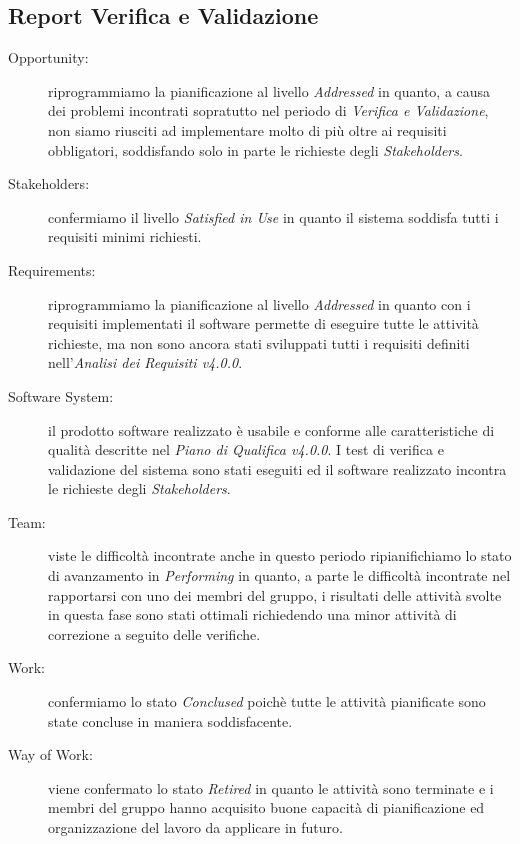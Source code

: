 \subsection{Report Verifica e Validazione}
\begin{description}
	\item[Opportunity:] riprogrammiamo la pianificazione al livello \textit{Addressed} in quanto, a causa dei problemi incontrati sopratutto nel periodo di \textit{Verifica e Validazione}, non siamo riusciti ad implementare molto di più oltre ai requisiti obbligatori, soddisfando solo in parte le richieste degli \textit{Stakeholders}.
	\item[Stakeholders:] confermiamo il livello \textit{Satisfied in Use} in quanto il sistema soddisfa tutti i requisiti minimi richiesti.
	\item[Requirements:] riprogrammiamo la pianificazione al livello \textit{Addressed} in quanto con i requisiti implementati il software permette di eseguire tutte le attività richieste, ma non sono ancora stati sviluppati tutti i requisiti definiti nell'\textit{Analisi dei Requisiti v4.0.0}.  
	\item[Software System:] il prodotto software realizzato è usabile e conforme alle caratteristiche di qualità descritte nel \textit{Piano di Qualifica v4.0.0}. I test di verifica e validazione del sistema sono stati eseguiti ed il software realizzato incontra le richieste degli \textit{Stakeholders}.
	\item[Team:] viste le difficoltà incontrate anche in questo periodo ripianifichiamo lo stato di avanzamento in \textit{Performing} in quanto, a parte le difficoltà incontrate nel rapportarsi con uno dei membri del gruppo, i risultati delle attività svolte in questa fase sono stati ottimali richiedendo una minor attività di correzione a seguito delle verifiche.
	\item[Work:] confermiamo lo stato \textit{Conclused} poichè tutte le attività pianificate sono state concluse in maniera soddisfacente.
	\item[Way of Work:] viene confermato lo stato \textit{Retired} in quanto le attività sono terminate e i membri del gruppo hanno acquisito buone capacità di pianificazione ed organizzazione del lavoro da applicare in futuro. 
\end{description}